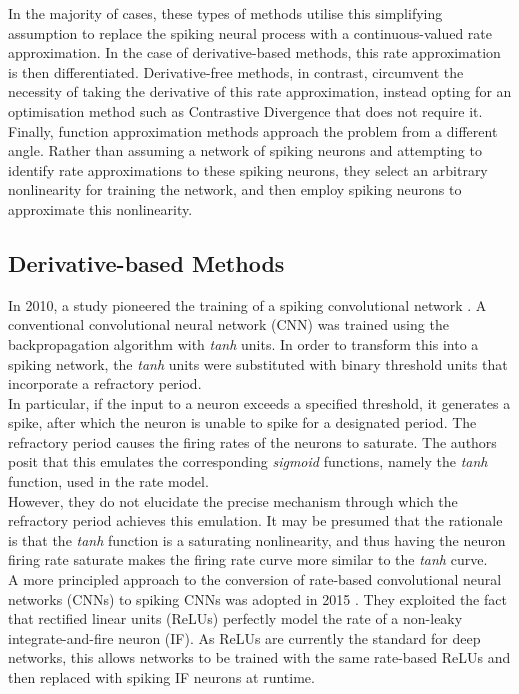\noindent In the majority of cases, these types of methods utilise this simplifying assumption to replace the spiking neural process with a continuous-valued rate approximation. In the case of derivative-based methods, this rate approximation is then differentiated. Derivative-free methods, in contrast, circumvent the necessity of taking the derivative of this rate approximation, instead opting for an optimisation method such as Contrastive Divergence that does not require it. \\

\noindent Finally, function approximation methods approach the problem from a different angle. Rather than assuming a network of spiking neurons and attempting to identify rate approximations to these spiking neurons, they select an arbitrary nonlinearity for training the network, and then employ spiking neurons to approximate this nonlinearity.

\subsection[Derivative-based Methods]{Derivative-based Methods}

\noindent In 2010, a study pioneered the training of a spiking convolutional network \cite{perez2010spike}. A conventional convolutional neural network (CNN) was trained using the backpropagation algorithm with \textit{tanh} units. In order to transform this into a spiking network, the \textit{tanh} units were substituted with binary threshold units that incorporate a refractory period. \\

\noindent In particular, if the input to a neuron exceeds a specified threshold, it generates a spike, after which the neuron is unable to spike for a designated period. The refractory period causes the firing rates of the neurons to saturate. The authors posit that this emulates the corresponding \textit{sigmoid} functions, namely the \textit{tanh} function, used in the rate model. \\

\noindent However, they do not elucidate the precise mechanism through which the refractory period achieves this emulation. It may be presumed that the rationale is that the \textit{tanh} function is a saturating nonlinearity, and thus having the neuron firing rate saturate makes the firing rate curve more similar to the \textit{tanh} curve. \\

\noindent A more principled approach to the conversion of rate-based convolutional neural networks (CNNs) to spiking CNNs was adopted in 2015 \cite{cao2015spiking}. They exploited the fact that rectified linear units (ReLUs) perfectly model the rate of a non-leaky integrate-and-fire neuron (IF). As ReLUs are currently the standard for deep networks, this allows networks to be trained with the same rate-based ReLUs and then replaced with spiking IF neurons at runtime. \\

